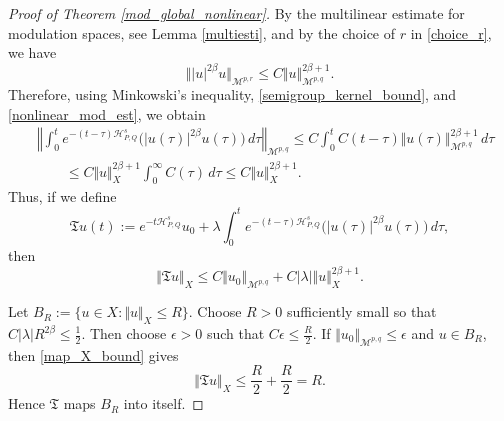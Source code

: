 \documentclass[12pt, reqno]{amsart}
\theoremstyle{definition}
\theoremstyle{remark}
\numberwithin{equation}{section}
\newcommand{\APQ}{\mathcal{H}_{P, Q}}
\begin{document}
\begin{proof}[Proof of Theorem \ref{mod_global_nonlinear}]
By the multilinear estimate for modulation spaces, see Lemma \ref{multiesti}, and by the choice of $r$ in \eqref{choice_r}, we have
\begin{equation}
\label{nonlinear_mod_est}
    \Vert |u|^{2\beta}u\Vert_{\mathcal M^{p,r}}
    \leq
    C
    \Vert u\Vert_{\mathcal M^{p,q}}^{2\beta+1}.
\end{equation}
Therefore, using Minkowski's inequality, \eqref{semigroup_kernel_bound}, and \eqref{nonlinear_mod_est}, we obtain
\[
\begin{aligned}
&\left\Vert
\int_0^t
e^{-(t-\tau)\APQ^s}
\big(|u(\tau)|^{2\beta}u(\tau)\big)
\,d\tau
\right\Vert_{\mathcal M^{p,q}}
\leq
C
\int_0^t
C(t-\tau)
\Vert u(\tau)\Vert_{\mathcal M^{p,q}}^{2\beta+1}
\,d\tau
\\
&\qquad
\leq
C
\Vert u\Vert_X^{2\beta+1}
\int_0^\infty C(\tau)\,d\tau
\leq
C
\Vert u\Vert_X^{2\beta+1}.
\end{aligned}
\]
Thus, if we define
\[
    \mathfrak T u(t)
    :=
    e^{-t\APQ^s}u_0
    +
    \lambda
    \int_0^t
    e^{-(t-\tau)\APQ^s}
    \big(|u(\tau)|^{2\beta}u(\tau)\big)
    \,d\tau ,
\]
then
\begin{equation}
\label{map_X_bound}
    \Vert \mathfrak T u\Vert_X
    \leq
    C
    \Vert u_0\Vert_{\mathcal M^{p,q}}
    +
    C|\lambda|
    \Vert u\Vert_X^{2\beta+1}.
\end{equation}

Let $B_R
    :=
    \{u\in X:\Vert u\Vert_X\leq R\}.$
Choose $R>0$ sufficiently small so that $ C|\lambda|R^{2\beta}\leq \frac12.$
Then choose $\epsilon>0$ such that $C\epsilon\leq \frac R2.$
If $\Vert u_0\Vert_{\mathcal M^{p,q}}\leq\epsilon$ and $u\in B_R$, then \eqref{map_X_bound} gives
\[
    \Vert \mathfrak T u\Vert_X
    \leq
    \frac R2+\frac R2
    =
    R.
\]
Hence $\mathfrak T$ maps $B_R$ into itself.


\end{proof}
\end{document}
